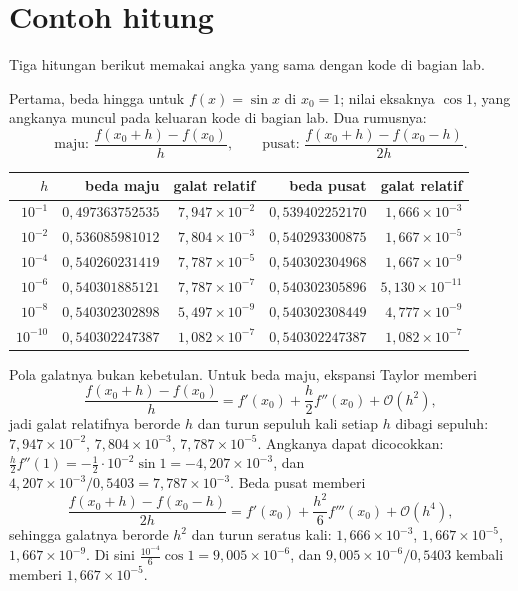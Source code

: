 \section{Contoh hitung}

Tiga hitungan berikut memakai angka yang sama dengan kode di bagian lab.

Pertama, beda hingga untuk $f(x)=\sin x$ di $x_{0}=1$; nilai eksaknya $\cos 1$, yang
angkanya muncul pada keluaran kode di bagian lab. Dua rumusnya:
\[
  \text{maju: }\frac{f(x_{0}+h)-f(x_{0})}{h},\qquad
  \text{pusat: }\frac{f(x_{0}+h)-f(x_{0}-h)}{2h}.
\]

\begin{center}
\begin{tabular}{rrrrr}
\hline
$h$ & beda maju & galat relatif & beda pusat & galat relatif\\
\hline
$10^{-1}$ & $0{,}497363752535$ & $7{,}947\times10^{-2}$ & $0{,}539402252170$ & $1{,}666\times10^{-3}$\\
$10^{-2}$ & $0{,}536085981012$ & $7{,}804\times10^{-3}$ & $0{,}540293300875$ & $1{,}667\times10^{-5}$\\
$10^{-4}$ & $0{,}540260231419$ & $7{,}787\times10^{-5}$ & $0{,}540302304968$ & $1{,}667\times10^{-9}$\\
$10^{-6}$ & $0{,}540301885121$ & $7{,}787\times10^{-7}$ & $0{,}540302305896$ & $5{,}130\times10^{-11}$\\
$10^{-8}$ & $0{,}540302302898$ & $5{,}497\times10^{-9}$ & $0{,}540302308449$ & $4{,}777\times10^{-9}$\\
$10^{-10}$ & $0{,}540302247387$ & $1{,}082\times10^{-7}$ & $0{,}540302247387$ & $1{,}082\times10^{-7}$\\
\hline
\end{tabular}
\end{center}

Pola galatnya bukan kebetulan. Untuk beda maju, ekspansi Taylor memberi
\[
  \frac{f(x_{0}+h)-f(x_{0})}{h}=f'(x_{0})+\frac{h}{2}f''(x_{0})+\mathcal{O}(h^{2}),
\]
jadi galat relatifnya berorde $h$ dan turun sepuluh kali setiap $h$ dibagi sepuluh:
$7{,}947\times10^{-2}$, $7{,}804\times10^{-3}$, $7{,}787\times10^{-5}$. Angkanya dapat
dicocokkan: $\frac{h}{2}f''(1)=-\frac{1}{2}\cdot10^{-2}\sin 1=-4{,}207\times10^{-3}$, dan
$4{,}207\times10^{-3}/0{,}5403=7{,}787\times10^{-3}$. Beda pusat memberi
\[
  \frac{f(x_{0}+h)-f(x_{0}-h)}{2h}=f'(x_{0})+\frac{h^{2}}{6}f'''(x_{0})+\mathcal{O}(h^{4}),
\]
sehingga galatnya berorde $h^{2}$ dan turun seratus kali: $1{,}666\times10^{-3}$,
$1{,}667\times10^{-5}$, $1{,}667\times10^{-9}$. Di sini $\frac{10^{-4}}{6}\cos 1
=9{,}005\times10^{-6}$, dan $9{,}005\times10^{-6}/0{,}5403$ kembali memberi $1{,}667\times10^{-5}$.

